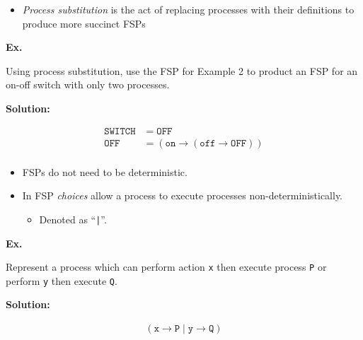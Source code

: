 \documentclass{article}
\newenvironment{example}[1][]{
	\vspace{1em}
	\large{\par\noindent\textbf{Ex.}}
}{\vspace{2.5em}}
\newenvironment{solution}[1][]{
	\par\noindent\textbf{\large{Solution:}}
	\par
	\vspace{1.5em}
}{\vspace{.5em}}
\begin{document}
\begin{itemize}
	\item \emph{Process substitution} is the act of replacing processes with their definitions to produce more succinct FSPs
\end{itemize}

\begin{example}
	Using process substitution, use the FSP for Example 2 to product an FSP for an on-off switch with only two processes.
\end{example}

\begin{solution}
	\begin{align*}
		\mathtt{SWITCH} &= \mathtt{OFF} \\
		\mathtt{OFF} &= \left( \mathtt{on} \rightarrow ( \mathtt{off} \rightarrow \mathtt{OFF}) \right) \\
	\end{align*}
\end{solution}

\begin{itemize}
	\item FSPs do not need to be deterministic.
	\item In FSP \emph{choices} allow a process to execute processes non-deterministically.
	\begin{itemize}
		\item Denoted as ``\texttt{|}''.
	\end{itemize}
\end{itemize}

\begin{example}
	Represent a process which can perform action \texttt{x} then execute process \texttt{P} or perform \texttt{y} then execute \texttt{Q}.
\end{example}

\begin{solution}
	\begin{align*}
		(\mathtt{x} \rightarrow \mathtt{P} \; | \; \mathtt{y} \rightarrow \texttt{Q})
	\end{align*}
\end{solution}
\end{document}
